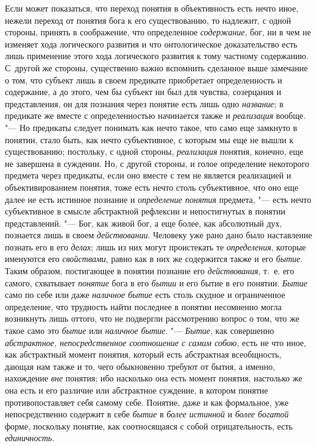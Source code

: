 Если может показаться, что переход понятия в объективность
есть нечто иное, нежели переход от понятия бога к его существованию, то
надлежит, с одной стороны, принять в соображение, что определенное
{\em содержание}, бог, ни
в чем не изменяет хода логического развития и что онтологическое
доказательство есть лишь применение этого хода логического развития к тому
частному содержанию. С~другой же стороны, существенно важно вспомнить
сделанное выше замечание о том, что субъект лишь в своем предикате
приобретает определенность и содержание, а до этого, чем бы субъект ни был
для чувства, созерцания и представления, он для познания через понятие есть
лишь одно {\em название};
в предикате же вместе с определенностью начинается также и
{\em реализация} вообще.
"--- Но предикаты следует понимать как нечто такое, что само еще
замкнуто в понятии, стало быть, как нечто субъективное, с которым мы еще не
вышли к существованию; постольку, с одной стороны,
{\em реализация} понятия,
конечно, еще не завершена в суждении. Но, с другой стороны, и голое
определение некоторого предмета через предикаты, если оно вместе с тем не
является реализацией и объективированием понятия, тоже есть нечто столь
субъективное, что оно еще далее не есть истинное познание и
{\em определение понятия}
предмета, "--- есть нечто субъективное в смысле
абстрактной рефлексии и непостигнутых в понятии представлений. "---
Бог, как живой бог, а еще более, как абсолютный дух,
познается лишь в своем {\em действовании}.
Человеку уже рано дано было наставление познать его в его
{\em делах}; лишь из них могут проистекать те {\em определения},
которые именуются его {\em свойствами}, равно
как в них же содержится также и его {\em бытие}. Таким
образом, постигающее в понятии познание его {\em действования}, т.~е.
его самого, схватывает {\em понятие} бога в его {\em бытии}
и его бытие в его понятии. {\em Бытие} само по себе
или даже {\em наличное бытие}
есть столь скудное и ограниченное определение, что трудность
найти последнее в понятии несомненно могла возникнуть лишь оттого, что не
подвергли рассмотрению вопрос о том, что же такое само это
{\em бытие} или {\em наличное бытие}. "--- {\em Бытие}, как
совершенно {\em абстрактное,
непосредственное соотношение с самим собою}, есть не что
иное, как абстрактный момент понятия, который есть
абстрактная всеобщность, дающая нам также и то, чего обыкновенно требуют от
бытия, а именно, нахождение {\em вне}
понятия; ибо насколько она есть момент понятия, настолько же
она есть и его различие или абстрактное суждение, в котором понятие
противопоставляет себя самому себе. Понятие, даже и как формальное, уже
непосредственно содержит в себе
{\em бытие} в {\em более истинной} и {\em более богатой}
форме, поскольку понятие, как соотносящаяся с собой
отрицательность, есть {\em единичность}.

